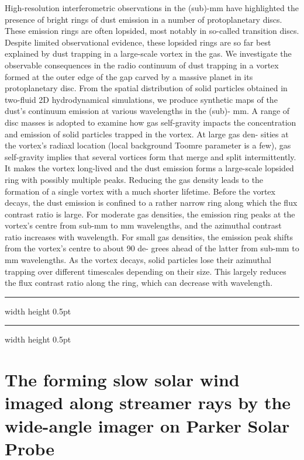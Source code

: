 \documentclass[a4paper,11pt]{book}
\def\doubleline{
\hrule width \hsize height 0.5pt  \kern 1mm \hrule width \hsize height 0.5pt 
}
\begin{document}
\vspace{2 mm}
\noindent High-resolution interferometric observations in the (sub)-mm have highlighted the presence of bright rings of dust emission in a number of protoplanetary discs. These emission rings are often lopsided, most notably in so-called transition discs. Despite limited observational evidence, these lopsided rings are so far best explained by dust trapping in a large-scale vortex in the gas. We investigate the observable consequences in the radio continuum of dust trapping in a vortex formed at the outer edge of the gap carved by a massive planet in its protoplanetary disc. From the spatial distribution of solid particles obtained in two-fluid 2D hydrodynamical simulations, we produce synthetic maps of the dust’s continuum emission at various wavelengths in the (sub)- mm. A range of disc masses is adopted to examine how gas self-gravity impacts the concentration and emission of solid particles trapped in the vortex. At large gas den- sities at the vortex’s radiaxl location (local background Toomre parameter is a few), gas self-gravity implies that several vortices form that merge and split intermittently. It makes the vortex long-lived and the dust emission forms a large-scale lopsided ring with possibly multiple peaks. Reducing the gas density leads to the formation of a single vortex with a much shorter lifetime. Before the vortex decays, the dust emission is confined to a rather narrow ring along which the flux contrast ratio is large. For moderate gas densities, the emission ring peaks at the vortex’s centre from sub-mm to mm wavelengths, and the azimuthal contrast ratio increases with wavelength. For small gas densities, the emission peak shifts from the vortex’s centre to about 90 de- grees ahead of the latter from sub-mm to mm wavelengths. As the vortex decays, solid particles lose their azimuthal trapping over different timescales depending on their size. This largely reduces the flux contrast ratio along the ring, which can decrease with wavelength.

\noindent\doubleline
        
          \section[The forming slow solar wind imaged along streamer rays by the wide-angle imager on Parker Solar Probe \newline(Nicolas Poirier)] { The forming slow solar wind imaged along streamer rays by the wide-angle imager on Parker Solar Probe }
\end{document}
